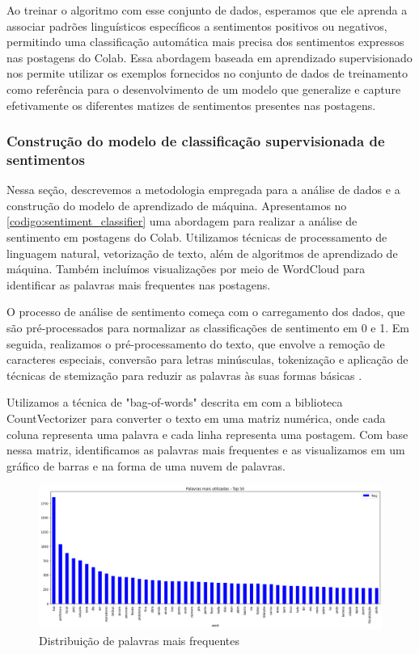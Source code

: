 Ao treinar o algoritmo com esse conjunto de dados, esperamos que ele aprenda a associar padrões linguísticos específicos a sentimentos positivos ou negativos, permitindo uma classificação automática mais precisa dos sentimentos expressos nas postagens do Colab. Essa abordagem baseada em aprendizado supervisionado nos permite utilizar os exemplos fornecidos no conjunto de dados de treinamento como referência para o desenvolvimento de um modelo que generalize e capture efetivamente os diferentes matizes de sentimentos presentes nas postagens.

\subsubsection*{Construção do modelo de classificação supervisionada de sentimentos}

Nessa seção, descrevemos a metodologia empregada para a análise de dados e a construção do modelo de aprendizado de máquina. Apresentamos no \autoref{codigo:sentiment_classifier} uma abordagem para realizar a análise de sentimento em postagens do Colab. Utilizamos técnicas de processamento de linguagem natural, vetorização de texto, além de algoritmos de aprendizado de máquina. Também incluímos visualizações por meio de WordCloud para identificar as palavras mais frequentes nas postagens.

O processo de análise de sentimento começa com o carregamento dos dados, que são pré-processados para normalizar as classificações de sentimento em 0 e 1. Em seguida, realizamos o pré-processamento do texto, que envolve a remoção de caracteres especiais, conversão para letras minúsculas, tokenização e aplicação de técnicas de stemização para reduzir as palavras às suas formas básicas \cite[]{2009_Bird_BOOK}.

Utilizamos a técnica de "bag-of-words" descrita em  com a biblioteca CountVectorizer para converter o texto em uma matriz numérica, onde cada coluna representa uma palavra e cada linha representa uma postagem. Com base nessa matriz, identificamos as palavras mais frequentes e as visualizamos em um gráfico de barras e na forma de uma nuvem de palavras.

\begin{figure}[!htb]
	\caption{Distribuição de palavras mais frequentes}
	\label{fig:wordcount}
	\centering
	\includegraphics[scale=0.35]{images/wordcount.png}
	\fautor
\end{figure}

